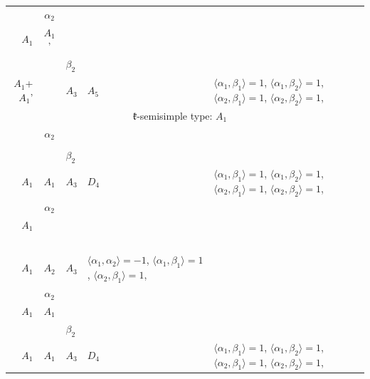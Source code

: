 \documentclass[12pt]{report}
\begin{document}
\begin{appendix}
{\begin{longtable}{rcl p{1cm}p{1cm}p{3cm} }
\begin{tabular}{cc}$\alpha_1$+ & $\alpha_2$\\\tiny{ $A_1$ } & \tiny{ $A_1$' }\end{tabular} &\begin{tabular}{c} = \\~ \end{tabular} & \begin{tabular}{cc}$\beta_1$+ & $\beta_2$\\\tiny{ $A_1$+$A_1$' } & \tiny{  }\end{tabular} & $A_3$ & $A_5$ &  $\langle\alpha_1, \beta_1\rangle=1$, $\langle\alpha_1, \beta_2\rangle=1$, $\langle\alpha_2, \beta_1\rangle=1$, $\langle\alpha_2, \beta_2\rangle=1$, 
\\
\hline\multicolumn{5}{c}{$\mathfrak{k}$-semisimple type: $A_1$}\\
\hline\hline\begin{tabular}{cc}$\alpha_1$+ & $\alpha_2$\\\tiny{  } & \tiny{  }\end{tabular} &\begin{tabular}{c} = \\~ \end{tabular} & \begin{tabular}{cc}$\beta_1$+ & $\beta_2$\\\tiny{ $A_1$ } & \tiny{ $A_1$ }\end{tabular} & $A_3$ & $D_4$ &  $\langle\alpha_1, \beta_1\rangle=1$, $\langle\alpha_1, \beta_2\rangle=1$, $\langle\alpha_2, \beta_1\rangle=1$, $\langle\alpha_2, \beta_2\rangle=1$, 
\\
\begin{tabular}{cc}$\alpha_1$+ & $\alpha_2$\\\tiny{ $A_1$ } & \tiny{  }\end{tabular} &\begin{tabular}{c} = \\~ \end{tabular} & \begin{tabular}{c}$\beta_1$\\\tiny{ $A_1$ }\end{tabular} & $A_2$ & $A_3$ & $\langle\alpha_1, \alpha_2\rangle=-1$,  $\langle\alpha_1, \beta_1\rangle=1$, $\langle\alpha_2, \beta_1\rangle=1$, 
\\
\begin{tabular}{cc}$\alpha_1$+ & $\alpha_2$\\\tiny{ $A_1$ } & \tiny{ $A_1$ }\end{tabular} &\begin{tabular}{c} = \\~ \end{tabular} & \begin{tabular}{cc}$\beta_1$+ & $\beta_2$\\\tiny{ $A_1$ } & \tiny{ $A_1$ }\end{tabular} & $A_3$ & $D_4$ &  $\langle\alpha_1, \beta_1\rangle=1$, $\langle\alpha_1, \beta_2\rangle=1$, $\langle\alpha_2, \beta_1\rangle=1$, $\langle\alpha_2, \beta_2\rangle=1$, 
\\
\end{longtable}

}
\end{appendix}
\end{document}
